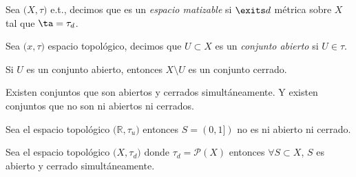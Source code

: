 \begin{defn}
  Sea $\big( X, \tau \big)$ e.t., decimos que es un \textit{espacio matizable} si $\exits d$ métrica sobre $X$ tal que $\ta = \tau_{d}$.
\end{defn}

\begin{defn}
  Sea $\big( x, \tau \big)$ espacio topológico, decimos que $U \subset X$ es un \textit{conjunto abierto} si $U \in \tau$.
\end{defn}

\begin{obs}
  Si $U$ es un conjunto abierto, entonces $X \setminus U$ es un conjunto cerrado.
\end{obs}

\begin{obs}
  Existen conjuntos que son abiertos y cerrados simultáneamente. Y existen conjuntos que no son ni abiertos ni cerrados.
\end{obs}

\begin{ejm}
  Sea el espacio topológico $\big( \mathbb{R}, \tau_{u} \big)$ entonces $S = (0,1])$ no es ni abierto ni cerrado.
\end{ejm}

\begin{ejm}
  Sea el espacio topológico $\big( X, \tau_{d} \big)$ donde $\tau_{d}=\mathcal{P}(X)$ entonces $\forall S \subset X$, $S$ es abierto y cerrado simultáneamente.
\end{ejm}
